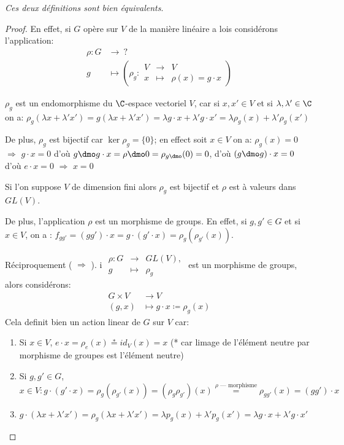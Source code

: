 \emph{Ces deux définitions sont bien équivalents}.
\begin{proof}
En effet, si $G$ opère sur $V$ de la manière linéaire a lois considérons l'application:
\begin{align*}	
	\rho:G &\rightarrow \ ? \\
	g &\mapsto  \left(\rho_g:\begin{array}{rcl}V&\rightarrow& V \\ x&\mapsto&\rho(x)=g\cdot x\end{array}\right)
\end{align*}

$\rho_g$ est un endomorphisme du $\C$-espace vectoriel $V$, car si $x,x'\in V$ et si $\lambda, \lambda'\in \C$ on a:
$\rho_g(\lambda x + \lambda' x')=g(\lambda x+\lambda' x')=\lambda g\cdot x+\lambda'g\cdot x'=\lambda\rho_g(x)+\lambda'\rho_g(x')$

De plus, $\rho_g$ est bijectif car $\ker\rho_g=\{0\}$; en effect soit $x\in V$ on a: $\rho_g(x)=0$  $\Rightarrow$  $g\cdot x=0$ d'où $g\dmo g\cdot x= \rho\dmo 0=\rho_{g\dmo}(0)=0$,
d'où $(g\dmo g)\cdot x=0$ d'où $e\cdot x=0$  $\Rightarrow$  $x=0$

Si l'on suppose $V$ de dimension fini alors $\rho_g$ est bijectif et $\rho$ est à valeurs dans $GL(V)$.

De plus, l'application $\rho$ est un morphisme de groups. En effet, si $g,g'\in G$ et si $x\in V$, on a : $f_{gg'}=(gg')\cdot x= g\cdot (g'\cdot x)=\rho_g(\rho_{g'}(x))$.

Réciproquement ( $\Rightarrow$ ).
i $\begin{array}{rcl}\rho: G &\rightarrow & GL(V),\\ g &\mapsto &\rho_g\end{array}$ est un morphisme de groups, alors considérons: 
\begin{align*}
G\times V &\rightarrow  V\\ (g,x) &\mapsto g\cdot x\coloneq\rho_g(x)
\end{align*}
Cela definit bien un action linear de $G$ sur $V$ car:
\begin{enumerate}
	\item Si $x\in V$, $e\cdot x=\rho_e(x) \overset\ast= id_V(x)=x$ (* car limage de l'élément neutre par morphisme de groupes est l'élément neutre)
	\item Si $g,g'\in G$, $x\in V: g\cdot(g'\cdot x)=\rho_g(\rho_{g'}(x))=(\rho_g\rho_{g'})(x)\overset{\rho\text{ --- morphisme}}{=}\rho_{gg'}(x)=(gg')\cdot x$
	\item $g\cdot (\lambda x+\lambda'x')=\rho_g(\lambda x+\lambda' x')= \lambda p_g(x)+\lambda' p_g(x')=\lambda g\cdot x+\lambda'g\cdot x'$
\end{enumerate}
\end{proof}

